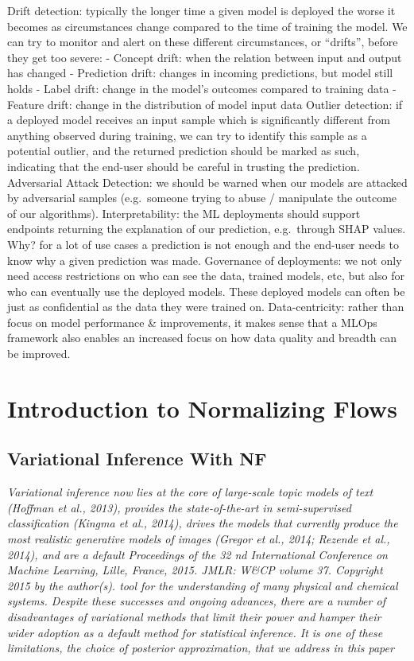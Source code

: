 \documentclass[
  11pt,
]{book}
\begin{document}
{Drift detection: typically the longer time a given model is deployed the worse it becomes as circumstances change compared to the time of training the model. We can try to monitor and alert on these different circumstances, or ``drifts'', before they get too severe:
- Concept drift: when the relation between input and output has changed
- Prediction drift: changes in incoming predictions, but model still holds
- Label drift: change in the model's outcomes compared to training data
- Feature drift: change in the distribution of model input data
Outlier detection: if a deployed model receives an input sample which is significantly different from anything observed during training, we can try to identify this sample as a potential outlier, and the returned prediction should be marked as such, indicating that the end-user should be careful in trusting the prediction.
Adversarial Attack Detection: we should be warned when our models are attacked by adversarial samples (e.g.~someone trying to abuse / manipulate the outcome of our algorithms).
Interpretability: the ML deployments should support endpoints returning the explanation of our prediction, e.g.~through SHAP values. Why? for a lot of use cases a prediction is not enough and the end-user needs to know why a given prediction was made.
Governance of deployments: we not only need access restrictions on who can see the data, trained models, etc, but also for who can eventually use the deployed models. These deployed models can often be just as confidential as the data they were trained on.
Data-centricity: rather than focus on model performance \& improvements, it makes sense that a MLOps framework also enables an increased focus on how data quality and breadth can be improved.}

\hypertarget{introduction-to-normalizing-flows}{%
\chapter{Introduction to Normalizing Flows}\label{introduction-to-normalizing-flows}}

\hypertarget{variational-inference-with-nf}{%
\section{Variational Inference With NF}\label{variational-inference-with-nf}}

\emph{Variational inference now lies at the core of large-scale topic models of text (Hoffman et al., 2013), provides the state-of-the-art in semi-supervised classification (Kingma et al., 2014), drives the models that currently produce the most realistic generative models of images (Gregor et al., 2014; Rezende et al., 2014), and are a default Proceedings of the 32 nd International Conference on Machine Learning, Lille, France, 2015. JMLR: W\&CP volume 37. Copyright 2015 by the author(s). tool for the understanding of many physical and chemical systems. Despite these successes and ongoing advances, there are a number of disadvantages of variational methods that limit their power and hamper their wider adoption as a default method for statistical inference. It is one of these limitations, the choice of posterior approximation, that we address in this paper}
\end{document}
